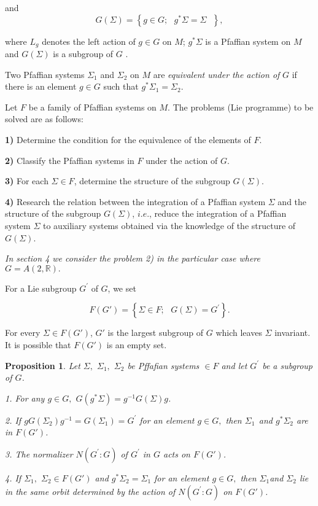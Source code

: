 \documentclass{amsproc}
\newtheorem{proposition}[theorem]{Proposition}
\theoremstyle{remark}
\numberwithin{equation}{section}
\begin{document}
and\begin{equation*}
G(\Sigma )=\left\{ g\in G;\text{ }g^{\ast }\Sigma =\Sigma \text{ }\right\} ,
\end{equation*}

where $L_{g}$ denotes the left action of $g\in G$ on $M$; $g^{\ast }\Sigma $
is a Pfaffian system on $M$ and $G(\Sigma )$ is a subgroup of $G$ .

Two Pfaffian systems $\Sigma _{1}$ and $\Sigma _{2}$ on $M$ are \textit{equivalent under the action of }$G$ if there is an element $g\in G$ such
that $g^{\ast }\Sigma _{1}=\Sigma _{2}$.

Let $F$ be a family of Pfaffian systems on $M$. The problems (Lie
programme) to be solved are as follows:

\textbf{1) }Determine the condition for the equivalence of the elements of
$F$.

\textbf{2) }Classify the Pfaffian systems in $F$ under the action
of $G$.

\textbf{3) }For each $\Sigma \in F$, determine the structure of
the subgroup $G(\Sigma )$.

\textbf{4) }Research the relation between the integration of a Pfaffian
system $\Sigma$ and the structure of the subgroup $G(\Sigma )$, $i.e.$,
reduce the integration of a Pfaffian system $\Sigma$ to auxiliary systems
obtained via the knowledge of the structure of $G(\Sigma )$.

\textit{In section 4 we consider the problem 2) in the particular case where 
}$G=A(2,\mathbb{R}
).$

For a Lie subgroup $G^{\prime }$ of $G$, we set

\begin{equation}
\label{eq:greno}                                                                                                                 F(G') =\left\{ \Sigma \in F ;\text{ }G(\Sigma
)=G^{\prime }\right\}. 
\end{equation}

For every $\Sigma \in F(G')$, $G'$ is the
largest subgroup of $G$ which leaves $\Sigma $ invariant. It is possible
that $F(G')$ is an empty set.

\begin{proposition}
Let $\Sigma ,$ $\Sigma _{1},$ $\Sigma _{2}$ be Pffafian systems $\in F$
and let $G^{\prime }$ be a subgroup of $G$.

1. For any $g\in G,$ $G(g^{\ast }\Sigma )=g^{-1}G(\Sigma )g$.

2. If $gG(\Sigma _{2})g^{-1}=G(\Sigma _{1})=G^{\prime }$ for an element $g\in G,$ then $\Sigma _{1\text{ }}$and $g^{\ast }\Sigma _{2}$ are in
$F(G')$.

3. The normalizer $N(G^{\prime }:G)$ of $G^{\prime }$ in $G$ acts on
$F(G')$.

4. If $\Sigma _{1},$ $\Sigma _{2}\in F(G')$ and $g^{\ast
}\Sigma _{2}=\Sigma _{1}$ for an element $g\in G,$ then $\Sigma _{1}$and $\Sigma _{2}$ lie in the same orbit determined by the action of $N(G^{\prime
}:G)$ on $F(G')$.
\end{proposition}
\end{document}
